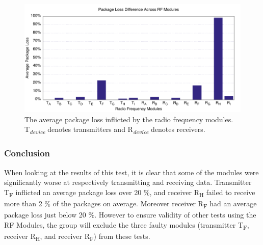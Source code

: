 \begin{figure}[h!]
\centering
\includegraphics[width=\linewidth]{Figures/Graphs/diff_graph.pdf}
\centering
\caption{The average package loss inflicted by the radio frequency modules.\\ \textsf{T}\textsubscript{\textit{device}} denotes transmitters and \textsf{R}\textsubscript{\textit{device}} denotes receivers.}    
\label{fig:trans_diff}        
\end{figure} 

\subsubsection*{Conclusion}
When looking at the results of this test, it is clear that some of the modules were significantly worse at respectively transmitting and receiving data.
Transmitter \textsf{T\textsubscript{F}} inflicted an average package loss over 20 \%, and receiver \textsf{R\textsubscript{H}} failed to receive more than 2 \% of the packages on average.
Moreover receiver \textsf{R\textsubscript{F}} had an average package loss just below 20 \%.
However to ensure validity of other tests using the RF Modules, the group will exclude the three faulty modules (transmitter \textsf{T\textsubscript{F}}, receiver \textsf{R\textsubscript{H}}, and receiver \textsf{R\textsubscript{F}}) from these tests.
